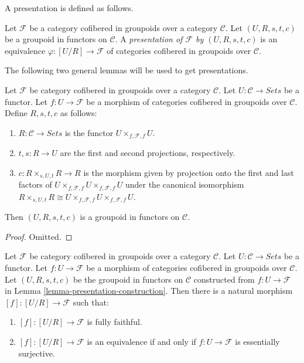 \noindent
A presentation is defined as follows.

\begin{definition}
\label{definition-presentation}
Let $\mathcal{F}$ be a category cofibered in groupoids over a category
$\mathcal{C}$.  Let $(U,R,s,t,c)$ be a groupoid in functors on $\mathcal{C}$.
A {\it presentation of $\mathcal{F}$ by $(U,R,s,t,c)$} is an equivalence 
$\varphi: [U/R] \to \mathcal{F}$ of categories cofibered in groupoids 
over $\mathcal{C}$.
\end{definition}

\noindent
The following two general lemmas will be used to get presentations.

\begin{lemma}
\label{lemma-presentation-construction}
Let $\mathcal{F}$ be category cofibered in groupoids over a category $\mathcal 
C$.  Let $U: \mathcal{C} \to \textit{Sets}$ be a functor. Let $f: 
U \to \mathcal{F}$ be a morphism of categories cofibered in groupoids 
over $\mathcal{C}$. Define $R,s,t,c$ as follows:
\begin{enumerate}
\item $R: \mathcal{C} \to \textit{Sets}$ is the functor $U 
\times_{f,\mathcal{F},f} U$.
\item $t,s: R \to U$ are the first and second projections, 
respectively. 
\item $c: R \times_{s,U,t} R \to R$ is the morphism given by projection 
onto the first and last factors of $U \times_{f, \mathcal{F}, f} U 
\times_{f,\mathcal{F},f} U$ under the canonical isomorphism $R \times_{s,U,t} R 
\cong U \times_{f, \mathcal{F}, f} U \times_{f,\mathcal{F},f} U$.
\end{enumerate}
Then $(U,R,s,t,c)$ is a groupoid in functors on $\mathcal{C}$.
\end{lemma}

\begin{proof}
Omitted.
\end{proof}

\begin{lemma}
\label{lemma-presentation-morphism}
Let $\mathcal{F}$ be category cofibered in groupoids over a category $\mathcal 
C$.  Let $U: \mathcal{C} \to \textit{Sets}$ be a functor. Let $f: 
U \to \mathcal{F}$ be a morphism of categories cofibered in groupoids 
over $\mathcal{C}$. Let $(U,R,s,t,c)$ be the groupoid in functors on $\mathcal 
C$ constructed from $f: U \to \mathcal{F}$ in Lemma 
\ref{lemma-presentation-construction}.  Then there is a natural morphism $[f]: 
[U/R] \to \mathcal{F}$ such that:
\begin{enumerate}
\item $[f]: [U/R] \to \mathcal{F}$ is fully faithful.
\item $[f]: [U/R] \to \mathcal{F}$ is an equivalence if and only if $f: 
U \to \mathcal{F}$ is essentially surjective.
\end{enumerate}
\end{lemma}

